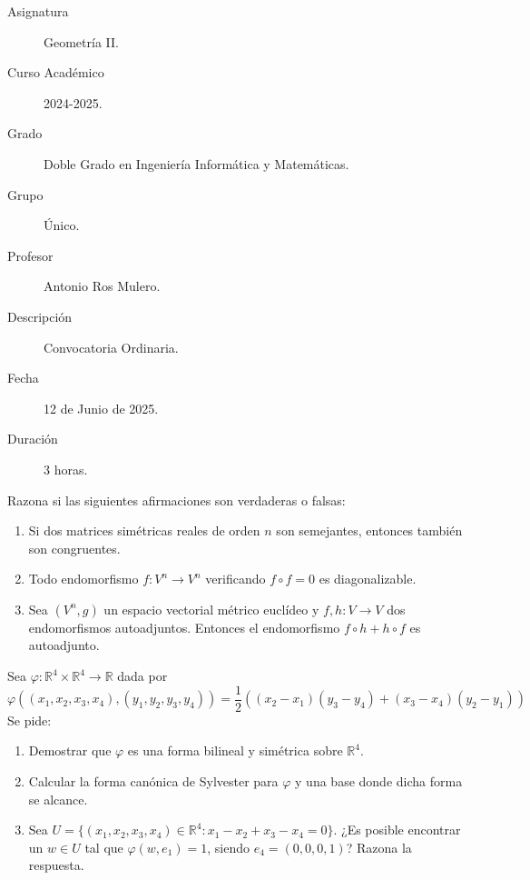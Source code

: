 \documentclass[12pt]{article}
\begin{document}
	
	
	
	
	
	\begin{description}
		\item[Asignatura] Geometría II.
		\item[Curso Académico] 2024-2025.
		\item[Grado] Doble Grado en Ingeniería Informática y Matemáticas.
		\item[Grupo] Único.
		\item[Profesor] Antonio Ros Mulero.
		\item[Descripción] Convocatoria Ordinaria.
		\item[Fecha] 12 de Junio de 2025.
		\item[Duración] 3 horas.
		
	\end{description}
	\newpage
	
	
	
	\begin{ejercicio}[3 puntos]
			Razona si las siguientes afirmaciones son verdaderas o falsas:
			\begin{enumerate}
				\item Si dos matrices simétricas reales de orden \( n \) son semejantes, entonces también son congruentes.
				\item Todo endomorfismo \( f : V^n \to V^n \) verificando \( f \circ f = 0 \) es diagonalizable.
				\item Sea \( (V^n, g) \) un espacio vectorial métrico euclídeo y \( f, h : V \to V \) dos endomorfismos autoadjuntos. Entonces el endomorfismo \( f \circ h + h \circ f \) es autoadjunto.
			\end{enumerate}
		\end{ejercicio}
	
	\begin{ejercicio}[3 puntos]
		Sea \( \varphi : \mathbb{R}^4 \times \mathbb{R}^4 \to \mathbb{R} \) dada por
		\[
		\varphi((x_1,x_2,x_3,x_4), (y_1,y_2,y_3,y_4)) =
		\frac{1}{2}\left( (x_2 - x_1)(y_3 - y_4) + (x_3 - x_4)(y_2 - y_1) \right)
		\]
		Se pide:
		\begin{enumerate}
			\item Demostrar que \( \varphi \) es una forma bilineal y simétrica sobre \( \mathbb{R}^4 \).
			\item Calcular la forma canónica de Sylvester para \( \varphi \) y una base donde dicha forma se alcance.
			\item Sea \( U = \{ (x_1,x_2,x_3,x_4) \in \mathbb{R}^4 : x_1 - x_2 + x_3 - x_4 = 0 \} \). ¿Es posible encontrar un \( w \in U \) tal que \( \varphi(w,e_1) = 1 \), siendo \( e_4 = (0,0,0,1) \)? Razona la respuesta.
		\end{enumerate}
	\end{ejercicio}
	
\end{document}
